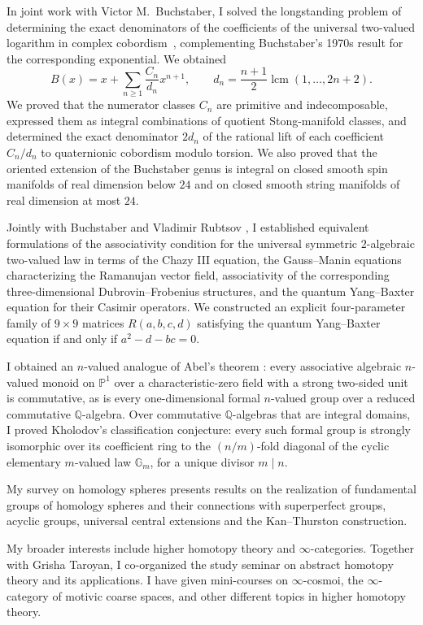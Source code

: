 \documentclass[12pt,a4paper,dvipsnames]{extarticle}
\begin{document}
In joint work with Victor M.~Buchstaber, I solved the longstanding problem of determining the exact denominators of the coefficients of the universal two-valued logarithm in complex cobordism~\cite{BK26Logarithm}, complementing Buchstaber's 1970s result for the corresponding exponential. We obtained
\[
B(x)=x+\sum_{n\geq1}\frac{C_n}{d_n}x^{n+1},
\qquad
d_n=\frac{n+1}{2}\operatorname{lcm}(1,\ldots,2n+2).
\]
We proved that the numerator classes $C_n$ are primitive and indecomposable, expressed them as integral combinations of quotient Stong-manifold classes, and determined the exact denominator $2d_n$ of the rational lift of each coefficient $C_n/d_n$ to quaternionic cobordism modulo torsion. We also proved that the oriented extension of the Buchstaber genus is integral on closed smooth spin manifolds of real dimension below $24$ and on closed smooth string manifolds of real dimension at most $24$.

Jointly with Buchstaber and Vladimir Rubtsov \cite{BKR26Associativity}, I established equivalent formulations of the associativity condition for the universal symmetric $2$-algebraic two-valued law in terms of the Chazy III equation, the Gauss--Manin equations characterizing the Ramanujan vector field, associativity of the corresponding three-dimensional Dubrovin--Frobenius structures, and the quantum Yang--Baxter equation for their Casimir operators. We constructed an explicit four-parameter family of $9\times9$ matrices $R(a,b,c,d)$ satisfying the quantum Yang--Baxter equation if and only if $a^2-d-bc=0$.

I obtained an $n$-valued analogue of Abel's theorem \cite{Kor26Abel}: every associative algebraic $n$-valued monoid on $\mathbb P^1$ over a characteristic-zero field with a strong two-sided unit is commutative, as is every one-dimensional formal $n$-valued group over a reduced commutative $\mathbb Q$-algebra. Over commutative $\mathbb Q$-algebras that are integral domains, I proved Kholodov's classification conjecture: every such formal group is strongly isomorphic over its coefficient ring to the $(n/m)$-fold diagonal of the cyclic elementary $m$-valued law $\mathbb G_m$, for a unique divisor $m\mid n$.

My survey \cite{Kor23Spheres} on homology spheres  presents results on the realization of fundamental groups of homology spheres and their connections with superperfect groups, acyclic groups, universal central extensions and the Kan--Thurston construction.

My broader interests include higher homotopy theory and $\infty$-categories. Together with Grisha Taroyan, I co-organized the study seminar on abstract homotopy theory and its applications. I have given mini-courses on $\infty$-cosmoi, the $\infty$-category of motivic coarse spaces, and other different topics in higher homotopy theory.
\end{document}
